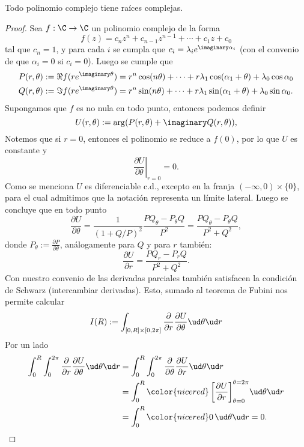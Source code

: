 \begin{thmi}
	Todo polinomio complejo tiene raíces complejas.
\end{thmi}
\begin{proof}
	Sea $f:\C\to\C$ un polinomio complejo de la forma
	$$ f(z) = c_nz^n + c_{n-1}z^{n-1} + \cdots + c_1z + c_0 $$
	tal que $c_n=1$, y para cada $i$ se cumpla que $c_i = \lambda_ie^{\imaginary\alpha_i}$ (con el convenio de que $\alpha_i = 0$ si $c_i = 0$).
	Luego se cumple que
	\begin{align*}
		P(r,\theta) := \Re f(re^{\imaginary\theta}) &= r^n\cos(n\theta) + \cdots + r\lambda_1\cos(\alpha_1+\theta) + \lambda_0\cos\alpha_0 \\
		Q(r,\theta) := \Im f(re^{\imaginary\theta}) &= r^n\sin(n\theta) + \cdots + r\lambda_1\sin(\alpha_1+\theta) + \lambda_0\sin\alpha_0.
	\end{align*}
	Supongamos que $f$ es no nula en todo punto, entonces podemos definir
	$$ U(r, \theta) := \arg(P(r,\theta) + \imaginary Q(r,\theta)), $$
	Notemos que si $r = 0$, entonces el polinomio se reduce a $f(0)$, por lo que $U$ es constante y
	$$ \left.\frac{\partial U}{\partial\theta}\right|_{r=0} = 0. $$
	Como se menciona $U$ es diferenciable c.d., excepto en la franja $(-\infty, 0)\times\{0\}$, para el cual admitimos que la notación representa un límite lateral.
	Luego se concluye que en todo punto
	$$ \frac{\partial U}{\partial\theta} = \frac{1}{(1 + Q/P)^2} \frac{PQ_\theta - P_\theta Q}{P^2} = \frac{PQ_\theta - P_\theta Q}{P^2 + Q^2}, $$
	donde $P_\theta := \frac{\partial P}{\partial\theta}$, análogamente para $Q$ y para $r$ también:
	$$ \frac{\partial U}{\partial r} = \frac{PQ_r - P_r Q}{P^2 + Q^2}. $$
	Con nuestro convenio de las derivadas parciales también satisfacen la condición de Schwarz (intercambiar derivadas).
	Esto, sumado al teorema de Fubini nos permite calcular
	$$ I(R) := \int_{[0,R]\times[0,2\pi]} \frac{\partial}{\partial r}\frac{\partial U}{\partial \theta} \ud\theta\ud r $$
	Por un lado
	\begin{align*}
		\int_0^R\int_0^{2\pi} \frac{\partial}{\partial r}\frac{\partial U}{\partial \theta} \ud\theta\ud r
		&= \int_0^R\int_0^{2\pi} \frac{\partial}{\partial \theta}\frac{\partial U}{\partial r} \ud\theta\ud r \\
		&= \int_0^R {\color{nicered} \left[ \frac{\partial U}{\partial r} \right]_{\theta=0}^{\theta=2\pi} } \ud\theta\ud r \\
		&= \int_0^R {\color{nicered} 0 } \,\ud\theta\ud r = 0.

\end{align*}
\end{proof}
